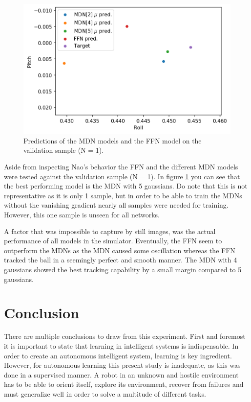 \documentclass{article}
\begin{document}
    \begin{figure}[!htb]
          \includegraphics[width=\textwidth]{../part2/all_mod_predictions.png}
        \caption{Predictions of the MDN models and the FFN model on the validation sample (N = 1).}
        \label{fig:pred-models}
    \end{figure}

    Aside from inspecting Nao's behavior the FFN and the different MDN models were tested against the validation sample (N = 1).
    In figure \ref{fig:pred-models} you can see that the best performing model is the MDN with 5 gaussians.
    Do note that this is not representative as it is only 1 sample, but in order to be able to train the MDNs without the vanishing gradient nearly all samples were needed for training.
    However, this one sample is unseen for all networks.

    A factor that was impossible to capture by still images, was the actual performance of all models in the simulator.
    Eventually, the FFN seem to outperform the MDNs as the MDN caused some oscillation whereas the FFN tracked the ball in a seemingly perfect and smooth manner.
    The MDN with 4 gaussians showed the best tracking capability by a small margin compared to 5 gaussians.

    \section{Conclusion}\label{sec:conclusion}
    There are multiple conclusions to draw from this experiment. First and foremost it is important to state that learning in intelligent systems is indispensable. 
    In order to create an autonomous intelligent system, learning is key ingredient. 
    However, for autonomous learning this present study is inadequate, as this was done in a supervised manner. 
    A robot in an unknown and hostile environment has to be able to orient itself, explore its environment, recover from failures and must generalize well in order to solve a multitude of different tasks\cite{thrun1995lifelong}. 
    
\end{document}
